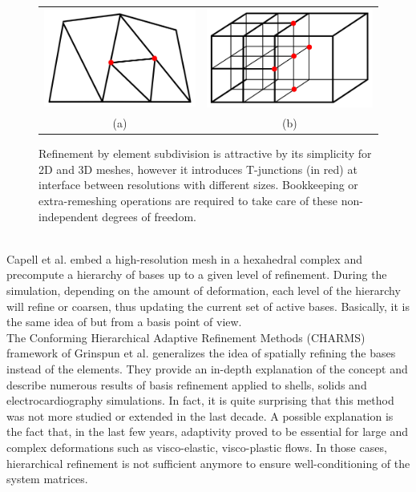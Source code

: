 \begin{figure}[!h]
	\centering
	\begin{tabular}{cc}
		\includegraphics[width=0.35\linewidth]{images/starAdaptivity-cgf2016/tjunction-triangle.png} &
		\includegraphics[width=0.35\linewidth]{images/starAdaptivity-cgf2016/tjunction-grid.png} \\
		(a) & (b)
	\end{tabular}
	\caption[STAR adaptivity: T-junction]{\label{fig:tjunctions} Refinement by element subdivision is attractive by its simplicity for 2D and 3D meshes, however it introduces T-junctions (in red) at interface between resolutions with different sizes. Bookkeeping or extra-remeshing operations are required to take care of these non-independent degrees of freedom.}
\end{figure}
\\
Capell et al. \cite{Capell2002} embed a high-resolution mesh in a hexahedral complex and precompute a hierarchy of bases up to a given level of refinement. During the simulation, depending on the amount of deformation, each level of the hierarchy will refine or coarsen, thus updating the current set of active bases. Basically, it is the same idea of \cite{Debunne2001} but from a basis point of view.
\\
The Conforming Hierarchical Adaptive Refinement Methods (CHARMS) framework of Grinspun et al. \cite{Grinspun2002} generalizes the idea of spatially refining the bases instead of the elements. They provide an in-depth explanation of the concept and describe numerous results of basis refinement applied to shells, solids and electrocardiography simulations.
In fact, it is quite surprising that this method was not more studied or extended in the last decade. A possible explanation is the fact that, in the last few years, adaptivity proved to be essential for large and complex deformations such as visco-elastic, visco-plastic flows. In those cases, hierarchical refinement is not sufficient anymore to ensure well-conditioning of the system matrices. 


